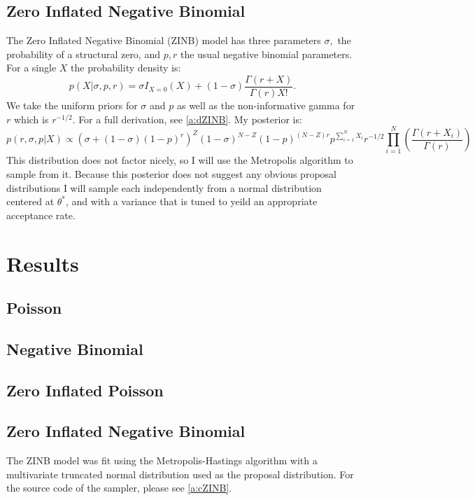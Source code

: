 \documentclass{article}\usepackage[]{graphicx}\usepackage[]{color}
\begin{document}
\subsection{Zero Inflated Negative Binomial}
\label{ss:mZiNBinom}
The Zero Inflated Negative Binomial (ZINB) model has three parameters $\sigma,$ the probability of a structural zero, and $p,r$ the usual negative binomial parameters. 
For a single $X$ the probability density is: 
$$p(X|\sigma, p, r) = \sigma I_{X=0}(X) + (1-\sigma)\frac{\Gamma(r+X)}{\Gamma(r)X!}.$$
We take the uniform priors for $\sigma$ and $p$ as well as the non-informative gamma for $r$ which is $r^{-1/2}$. For a full derivation, see \ref{a:dZINB}. My posterior is:
$$p(r,\sigma, p|X)\propto\left(\sigma + (1-\sigma)(1-p)^r\right)^Z(1-\sigma)^{N-Z}(1-p)^{(N-Z)r}p^{\sum_{i=1}^NX_i}r^{-1/2}\prod_{i=1}^N\left(\frac{\Gamma(r+X_i)}{\Gamma(r)}\right)$$
This distribution does not factor nicely, so I will use the Metropolis algorithm to sample from it. 
Because this posterior does not suggest any obvious proposal distributions I will sample each independently from a normal distribution centered at $\theta^*$, and with a variance that is tuned to yeild an appropriate acceptance rate.

\section{Results}
\label{s:results}
\subsection{Poisson}
\label{ss:rPoisson}

\subsection{Negative Binomial}
\label{ss:rNBinom}

\subsection{Zero Inflated Poisson}
\label{ss:rZiPoisson}

\subsection{Zero Inflated Negative Binomial}
\label{ss:rZiNBinom}



The ZINB model was fit using the Metropolis-Hastings algorithm with a multivariate truncated normal distribution used as the proposal distribution. For the source code of the sampler, please see \ref{a:cZINB}.
\end{document}
